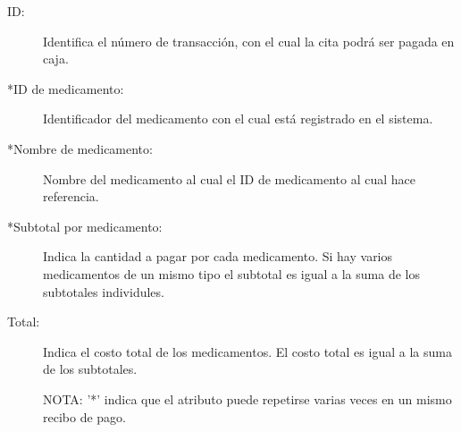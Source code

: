 \begin{description}
	\item[ID: ] Identifica el n\'umero de transacci\'on, con el cual la cita podr\'a ser pagada en caja.
	\item[*ID de medicamento: ] Identificador del medicamento con el cual est\'a registrado en el sistema.
	\item[*Nombre de medicamento: ] Nombre del medicamento al cual el ID de medicamento al cual hace referencia.
	\item[*Subtotal por medicamento: ] Indica la cantidad a pagar por cada medicamento. Si hay varios medicamentos de un mismo tipo el subtotal es igual a la suma de los subtotales individules.
	\item[Total: ] Indica el costo total de los medicamentos. El costo total es igual a la suma de los subtotales.
	
	NOTA: '*' indica que el atributo puede repetirse varias veces en un mismo recibo de pago.
\end{description}



